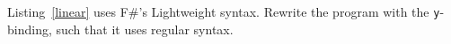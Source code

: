 Listing~\ref{linear} uses F\#'s Lightweight syntax. Rewrite the program with the \lstinline!y!-binding, such that it uses regular syntax.
